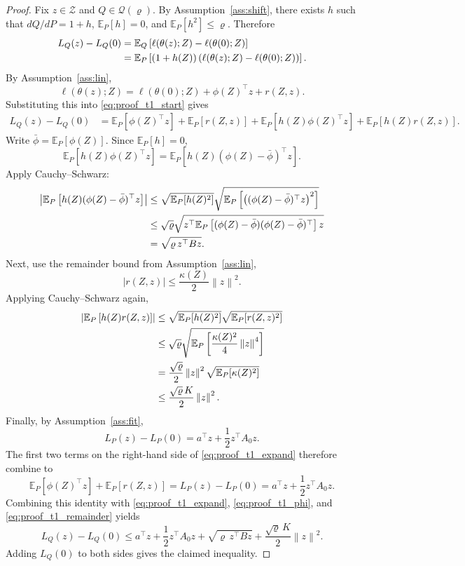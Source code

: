 \documentclass{article}
\newcommand{\EE}{\mathbb{E}}
\newcommand{\cQ}{\mathcal{Q}}
\newcommand{\cZ}{\mathcal{Z}}
\newcommand{\loss}{\ell}
\newcommand{\norm}[1]{\left\lVert #1 \right\rVert}
\newcommand{\abs}[1]{\left\lvert #1 \right\rvert}
\newcommand{\paren}[1]{\left( #1 \right)}
\newcommand{\bracks}[1]{\left[ #1 \right]}
\begin{document}
\begin{proof}
Fix \(z\in\cZ\) and \(Q\in\cQ(\varrho)\). By Assumption~\ref{ass:shift}, there exists \(h\) such that \(dQ/dP = 1+h\), \(\EE_P[h]=0\), and \(\EE_P[h^2]\le \varrho\). Therefore
\begin{align}
L_Q(z)-L_Q(0)
&=
\EE_Q\bracks{\loss(\theta(z);Z)-\loss(\theta(0);Z)} \notag\\
&=
\EE_P\bracks{(1+h(Z))\paren{\loss(\theta(z);Z)-\loss(\theta(0);Z)}}.
\label{eq:proof_t1_start}
\end{align}
By Assumption~\ref{ass:lin},
\[
\loss(\theta(z);Z)
=
\loss(\theta(0);Z)
+
\phi(Z)^\top z
+
r(Z,z).
\]
Substituting this into \eqref{eq:proof_t1_start} gives
\begin{align}
L_Q(z)-L_Q(0)
&=
\EE_P\bracks{\phi(Z)^\top z}
+
\EE_P\bracks{r(Z,z)}
+
\EE_P\bracks{h(Z)\phi(Z)^\top z}
+
\EE_P\bracks{h(Z)r(Z,z)}.
\label{eq:proof_t1_expand}
\end{align}
Write \(\bar\phi=\EE_P[\phi(Z)]\). Since \(\EE_P[h]=0\),
\[
\EE_P\bracks{h(Z)\phi(Z)^\top z}
=
\EE_P\bracks{h(Z)(\phi(Z)-\bar\phi)^\top z}.
\]
Apply Cauchy--Schwarz:
\begin{align}
\abs{\EE_P\bracks{h(Z)(\phi(Z)-\bar\phi)^\top z}}
&\le
\sqrt{\EE_P[h(Z)^2]}
\sqrt{\EE_P\bracks{\paren{(\phi(Z)-\bar\phi)^\top z}^2}} \notag\\
&\le
\sqrt{\varrho}
\sqrt{z^\top \EE_P\bracks{(\phi(Z)-\bar\phi)(\phi(Z)-\bar\phi)^\top} z} \notag\\
&=
\sqrt{\varrho\, z^\top B z}.
\label{eq:proof_t1_phi}
\end{align}
Next, use the remainder bound from Assumption~\ref{ass:lin},
\[
\abs{r(Z,z)} \le \frac{\kappa(Z)}{2}\norm{z}^2.
\]
Applying Cauchy--Schwarz again,
\begin{align}
\abs{\EE_P\bracks{h(Z)r(Z,z)}}
&\le
\sqrt{\EE_P[h(Z)^2]}
\sqrt{\EE_P[r(Z,z)^2]} \notag\\
&\le
\sqrt{\varrho}
\sqrt{
\EE_P\bracks{\frac{\kappa(Z)^2}{4}\norm{z}^4}
} \notag\\
&=
\frac{\sqrt{\varrho}}{2}\norm{z}^2
\sqrt{\EE_P[\kappa(Z)^2]} \notag\\
&\le
\frac{\sqrt{\varrho}\,K}{2}\norm{z}^2.
\label{eq:proof_t1_remainder}
\end{align}
Finally, by Assumption~\ref{ass:fit},
\[
L_P(z)-L_P(0)=a^\top z + \frac12 z^\top A_0 z.
\]
The first two terms on the right-hand side of \eqref{eq:proof_t1_expand} therefore combine to
\[
\EE_P\bracks{\phi(Z)^\top z}
+
\EE_P\bracks{r(Z,z)}
=
L_P(z)-L_P(0)
=
a^\top z + \frac12 z^\top A_0 z.
\]
Combining this identity with \eqref{eq:proof_t1_expand}, \eqref{eq:proof_t1_phi}, and \eqref{eq:proof_t1_remainder} yields
\[
L_Q(z)-L_Q(0)
\le
a^\top z + \frac12 z^\top A_0 z
+
\sqrt{\varrho\, z^\top B z}
+
\frac{\sqrt{\varrho}\,K}{2}\norm{z}^2.
\]
Adding \(L_Q(0)\) to both sides gives the claimed inequality.
\end{proof}
\end{document}
